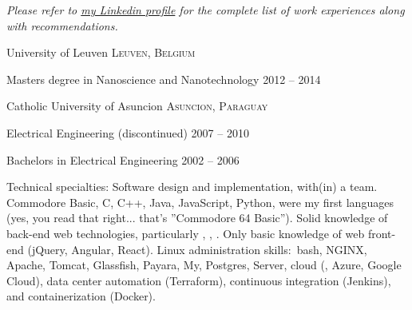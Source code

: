 \documentclass[10pt,a4paper]{article} %
\begin{document}

\begin{center}
\textit{Please refer to \href{http://www.linkedin.com/in/lugaramirez}{my Linkedin profile} for the complete list of work experiences along with recommendations.}
\end{center}


\spacedhrule{-0.2em}{-0.4em} %



\headedsection %
{University of Leuven}
{\textsc{Leuven, Belgium}} {

\headedsubsection %
{Masters degree in Nanoscience and Nanotechnology}
{2012 -- 2014}
{}
}


\headedsection %
{Catholic University of Asuncion}
{\textsc{Asuncion, Paraguay}} {

\headedsubsection %
{Electrical Engineering \textnormal{(discontinued)}}
{2007 -- 2010} {}

\headedsubsection %
{Bachelors in Electrical Engineering}
{2002 -- 2006} {}
}

\spacedhrule{0.5em}{-0.4em} %



\inlineheadsection %
{Technical specialties:}
{Software design and implementation, with(in) a team. Commodore Basic, C, C++, Java, JavaScript, Python, were my first languages (yes, you read that right... that's ''Commodore 64 Basic''). Solid knowledge of back-end web technologies, particularly , , . Only basic knowledge of web front-end (jQuery, Angular, React). Linux administration skills:\ bash, NGINX, Apache, Tomcat, Glassfish, Payara, My, Postgres, Server, cloud (, Azure, Google Cloud), data center automation (Terraform), continuous integration (Jenkins), and containerization (Docker).}
\end{document}
